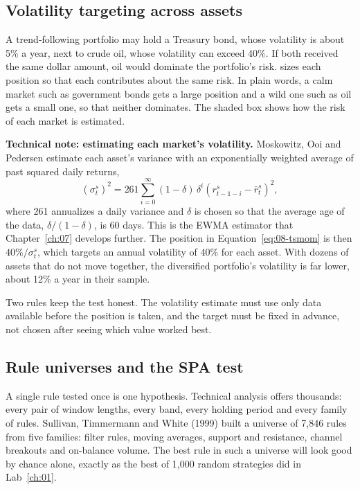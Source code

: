 \subsection{Volatility targeting across assets}

A trend-following portfolio may hold a Treasury bond, whose volatility is about 5\% a year, next to crude oil, whose volatility can exceed 40\%. If both received the same dollar amount, oil would dominate the portfolio's risk.  sizes each position so that each contributes about the same risk. In plain words, a calm market such as government bonds gets a large position and a wild one such as oil gets a small one, so that neither dominates. The shaded box shows how the risk of each market is estimated.

\begin{technote}
\textbf{Technical note: estimating each market's volatility.} Moskowitz, Ooi and Pedersen estimate each asset's variance with an exponentially weighted average of past squared daily returns,
\begin{equation}
  \left(\sigma^s_t\right)^2 = 261 \sum_{i=0}^{\infty} (1-\delta)\,\delta^i \left(r^s_{t-1-i} - \bar r^s_t\right)^2,
  \label{eq:08-ewma}
\end{equation}
where 261 annualizes a daily variance and $\delta$ is chosen so that the average age of the data, $\delta/(1-\delta)$, is 60 days. This is the EWMA estimator that Chapter~\ref{ch:07} develops further. The position in Equation~\eqref{eq:08-tsmom} is then $40\%/\sigma^s_t$, which targets an annual volatility of 40\% for each asset. With dozens of assets that do not move together, the diversified portfolio's volatility is far lower, about 12\% a year in their sample.
\end{technote}

Two rules keep the test honest. The volatility estimate must use only data available before the position is taken, and the target must be fixed in advance, not chosen after seeing which value worked best.

\subsection{Rule universes and the SPA test}

A single rule tested once is one hypothesis. Technical analysis offers thousands: every pair of window lengths, every band, every holding period and every family of rules. Sullivan, Timmermann and White (1999) built a universe of 7,846 rules from five families: filter rules, moving averages, support and resistance, channel breakouts and on-balance volume. The best rule in such a universe will look good by chance alone, exactly as the best of 1,000 random strategies did in Lab~\ref{ch:01}.

